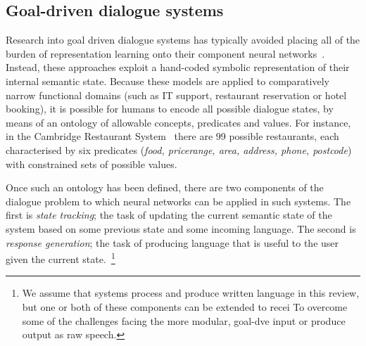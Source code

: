 \documentclass[11pt,letterpaper]{article}
\begin{document}
\subsection{Goal-driven dialogue systems}
Research into goal driven dialogue systems has typically avoided placing all of the burden of representation learning onto their component neural networks~\cite{henderson2014word,mrkvsic2015multi,wen2015stochastic,wen2015semantically}. Instead, these approaches exploit a hand-coded symbolic representation of their internal semantic state. Because these models are applied to comparatively narrow functional domains (such as IT support, restaurant reservation or hotel booking), it is possible for humans to encode all possible dialogue states, by means of an ontology of allowable concepts, predicates and values. For instance, in the Cambridge Restaurant System~\cite{wen2016network} there are 99 possible restaurants, each characterised by six predicates (\emph{food, pricerange, area, address, phone, postcode}) with constrained sets of possible values. 

Once such an ontology has been defined, there are two components of the dialogue problem to which neural networks can be applied in such systems. The first is \emph{state tracking}; the task of updating the current semantic state of the system based on some previous state and some incoming language. The second is \emph{response generation}; the task of producing language that is useful to the user given the current state.~\footnote{We assume that systems process and produce written language in this review, but one or both of these components can be extended to recei
To overcome some of the challenges facing the more modular, goal-dve input or produce output as raw speech.}
\end{document}

